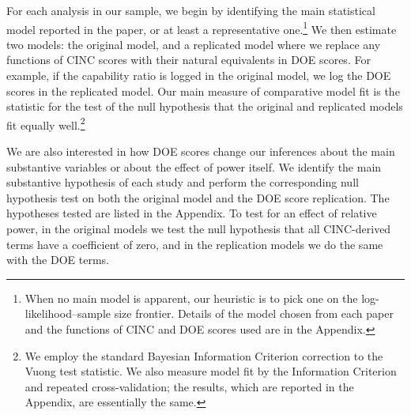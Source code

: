 For each analysis in our sample, we begin by identifying the main statistical model reported in the paper, or at least a representative one.\footnote{%
  When no main model is apparent, our heuristic is to pick one on the log-likelihood--sample size frontier.
  Details of the model chosen from each paper and the functions of CINC and DOE scores used are in the Appendix.
}
We then estimate two models: the original model, and a replicated model where we replace any functions of CINC scores with their natural equivalents in DOE scores.
For example, if the capability ratio is logged in the original model, we log the DOE scores in the replicated model.
Our main measure of comparative model fit is the \citet{Vuong:1989uf} statistic for the test of the null hypothesis that the original and replicated models fit equally well.\footnote{%
  We employ the standard Bayesian Information Criterion \citep{Schwarz:1978kh} correction to the Vuong test statistic.
  We also measure model fit by the \citet{Akaike:1974ih} Information Criterion and repeated cross-validation; the results, which are reported in the Appendix, are essentially the same.
}


We are also interested in how DOE scores change our inferences about the main substantive variables or about the effect of power itself.
We identify the main substantive hypothesis of each study and perform the corresponding null hypothesis test on both the original model and the DOE score replication.
The hypotheses tested are listed in the Appendix.
To test for an effect of relative power, in the original models we test the null hypothesis that all CINC-derived terms have a coefficient of zero, and in the replication models we do the same with the DOE terms.

